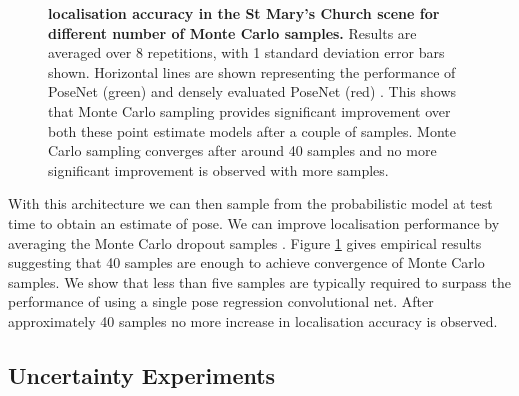 \begin{figure}[t]
\begin{center}
{\begin{subfigure}[b]{0.48\linewidth}
    \end{subfigure}
    }
\end{center}
   \caption[Localisation accuracy against number of MC samples.]{\textbf{localisation accuracy in the St Mary's Church scene for different number of Monte Carlo samples.} Results are averaged over 8 repetitions, with 1 standard deviation error bars shown. Horizontal lines are shown representing the performance of PoseNet (green) and densely evaluated PoseNet (red) \citep{kendall2015posenet}. This shows that Monte Carlo sampling provides significant improvement over both these point estimate models after a couple of samples. Monte Carlo sampling converges after around 40 samples and no more significant improvement is observed with more samples.}
\label{fig:samples}
\end{figure}

With this architecture we can then sample from the probabilistic model at test time to obtain an estimate of pose. We can improve localisation performance by averaging the Monte Carlo dropout samples \citep{Gal2016Bayesian}. Figure \ref{fig:samples} gives empirical results suggesting that 40 samples are enough to achieve convergence of Monte Carlo samples. We show that less than five samples are typically required to surpass the performance of using a single pose regression convolutional net. After approximately 40 samples no more increase in localisation accuracy is observed.

\subsection{Uncertainty Experiments}


